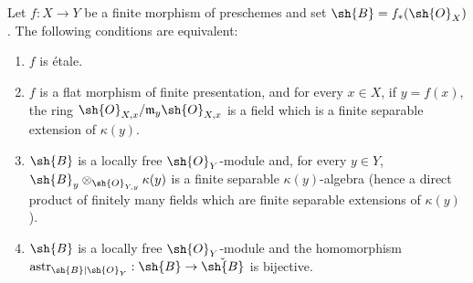 \begin{proposition}[18.2.3]
\label{IV.18.2.3}
Let $f:X\to Y$ be a finite morphism of preschemes and set $\sh{B}=f_*(\sh{O}_X)$.
The following conditions are equivalent:
\begin{enumerate}
  \item[a)] $f$ is \'etale.
  \item[a$'$)] $f$ is a flat morphism of finite presentation, and for every $x\in X$, if $y=f(x)$, the ring $\sh{O}_{X,x}/\mathfrak{m}_y\sh{O}_{X,x}$ is a field which is a finite separable extension of $\kappa(y)$.
  \item[b)] $\sh{B}$ is a locally free $\sh{O}_Y$-module and, for every $y\in Y$, $\sh{B}_y\otimes_{\sh{O}_{Y,y}}\kappa(y)$ is a finite separable $\kappa(y)$-algebra (hence a direct product of finitely many fields which are finite separable extensions of $\kappa(y)$).
  \item[c)] $\sh{B}$ is a locally free $\sh{O}_Y$-module and the homomorphism $\operatorname{astr}_{\sh{B}|\sh{O}_Y}:\sh{B}\to\check{\sh{B}}$  is bijective.
\end{enumerate}
\end{proposition}

